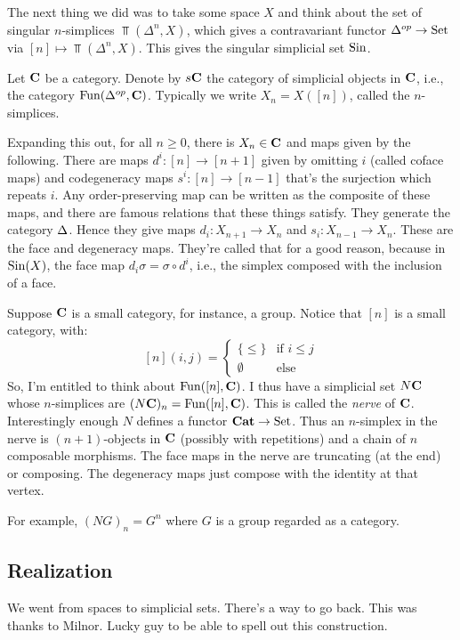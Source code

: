 The next thing we did was to take some space $X$ and think about the set of singular $n$-simplices $\Top(\Delta^n,X)$, which gives a contravariant functor ${\Delta}^{op}\to\mathrm{Set}$ via $[n]\mapsto\Top(\Delta^n,X)$. This gives the singular simplicial set $\mathrm{Sin}$.
\begin{definition}
    Let $\mathbf C$ be a category. Denote by $s\mathbf C$ the category of simplicial objects in $\mathbf C$, i.e., the category $\operatorname{Fun}({\Delta}^{op},\mathbf C)$.
    Typically we write $X_n = X([n])$, called the $n$-simplices.
\end{definition}
Expanding this out, for all $n\geq 0$, there is $X_n\in\mathbf C$ and maps given by the following. There are maps $d^i:[n]\to [n+1]$ given by omitting $i$ (called coface maps)
and codegeneracy maps $s^i:[n]\to[n-1]$ that's the surjection which repeats $i$.
Any order-preserving map can be written as the composite of these maps, and there are famous relations that these things satisfy.
They generate the category ${\Delta}$.
Hence they give maps $d_i:X_{n+1}\to X_n$ and $s_i:X_{n-1}\to X_n$. These are the face and degeneracy maps.
They're called that for a good reason, because in $\mathrm{Sin}(X)$, the face map $d_i\sigma = \sigma\circ d^i$, i.e., the simplex composed with the inclusion of a face.
\begin{example}
    Suppose $\mathbf C$ is a small category, for instance, a group.
    Notice that $[n]$ is a small category, with:
    $$
    [n](i,j) = \begin{cases}
	\{\leq\} & \text{if }i\leq j\\
	\emptyset & \text{else}
    \end{cases}
    $$
    So, I'm entitled to think about $\operatorname{Fun}([n],\mathbf C)$.
    I thus have a simplicial set $N\mathbf C$ whose $n$-simplices are $(N\mathbf C)_n = \operatorname{Fun}([n],\mathbf C)$.
    This is called the \emph{nerve} of $\mathbf C$.
    Interestingly enough $N$ defines a functor $\mathbf{Cat}\to\mathrm{Set}$.
    Thus an $n$-simplex in the nerve is $(n+1)$-objects in $\mathbf C$ (possibly with repetitions) and a chain of $n$ composable morphisms.
    The face maps in the nerve are truncating (at the end) or composing.
    The degeneracy maps just compose with the identity at that vertex.

    For example, $(NG)_n = G^n$ where $G$ is a group regarded as a category.
\end{example}
\subsection{Realization}
We went from spaces to simplicial sets. There's a way to go back.
This was thanks to Milnor. Lucky guy to be able to spell out this construction.

